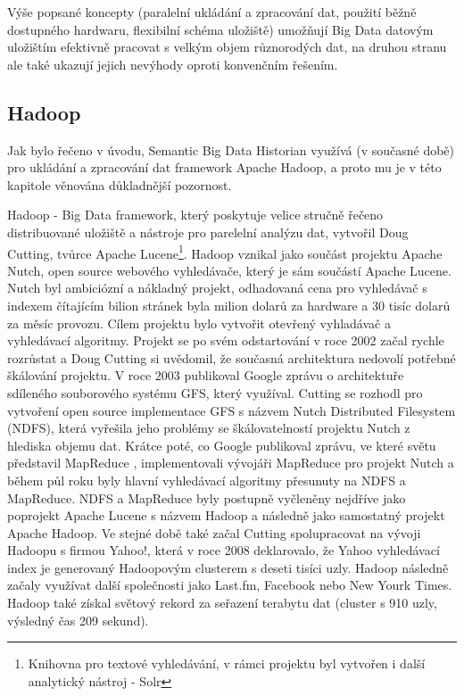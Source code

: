 \documentclass[11pt,twoside,a4paper]{book}
\begin{document}
		Výše popsané koncepty (paralelní ukládání a zpracování dat, použití běžně dostupného hardwaru, flexibilní schéma uložiště) umožňují Big Data datovým uložištím efektivně pracovat s velkým objem různorodých dat, na druhou stranu ale také ukazují jejich nevýhody oproti konvenčním řešením. 

		\subsection{Hadoop} \label{sec:hadoop}
		Jak bylo řečeno v úvodu, Semantic Big Data Historian využívá (v současné době) pro ukládání a zpracování dat framework Apache Hadoop, a proto mu je v této kapitole věnována důkladnější pozornost.

		Hadoop - Big Data framework, který poskytuje velice stručně řečeno distribuované uložiště a nástroje pro parelelní analýzu dat, vytvořil Doug Cutting, tvůrce Apache Lucene\footnote{Knihovna pro textové vyhledávání, v rámci projektu byl vytvořen i další analytický nástroj - Solr}. Hadoop vznikal jako součást projektu Apache Nutch, open source webového vyhledávače, který je sám součástí Apache Lucene. Nutch byl ambiciózní a nákladný projekt, odhadovaná cena pro vyhledávač s indexem čítajícím bilion stránek byla milion dolarů za hardware a 30 tisíc dolarů za měsíc provozu. Cílem projektu bylo vytvořit otevřený vyhladávač a vyhledávací algoritmy. Projekt se po svém odstartování v roce 2002 začal rychle rozrůstat a Doug Cutting si uvědomil, že současná architektura nedovolí potřebné škálování projektu. V roce 2003 publikoval Google zprávu o architektuře sdíleného souborového systému GFS, který využíval.\cite{GFS01} Cutting se rozhodl pro vytvoření open source implementace GFS s názvem Nutch Distributed Filesystem (NDFS), která vyřešila jeho problémy se škálovatelností projektu Nutch z hlediska objemu dat. Krátce poté, co Google publikoval zprávu, ve které světu představil MapReduce \cite{MapRed01}, implementovali vývojáři MapReduce pro projekt Nutch a během půl roku byly hlavní vyhledávací algoritmy přesunuty na NDFS a MapReduce. NDFS a MapReduce byly postupně vyčleněny nejdříve jako poprojekt Apache Lucene s názvem Hadoop a následně jako samostatný projekt Apache Hadoop. Ve stejné době také začal Cutting spolupracovat na vývoji Hadoopu s firmou Yahoo!, která v roce 2008 deklarovalo, že Yahoo vyhledávací index je generovaný Hadoopovým clusterem s deseti tisíci uzly. Hadoop následně začaly využívat další společnosti jako Last.fm, Facebook nebo New Yourk Times. Hadoop také získal světový rekord za seřazení terabytu dat (cluster s 910 uzly, výsledný čas 209 sekund). \cite{white01}
		
\end{document}
